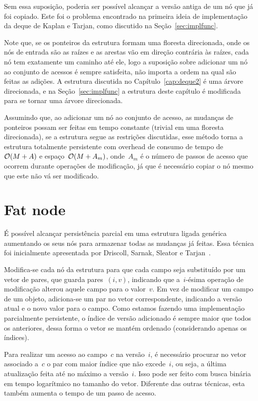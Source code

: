 \documentclass[../../main.tex]{subfiles}
\begin{document}
Sem essa suposição, poderia ser possível alcançar a versão antiga de um nó que já foi copiado. Este foi o problema encontrado na primeira ideia de implementação da deque de Kaplan e Tarjan, como discutido na Seção~\ref{sec:implfunc}.

Note que, se os ponteiros da estrutura formam uma floresta direcionada, onde os nós de entrada são as raízes e as arestas vão em direção contrária às raízes, cada nó tem exatamente um caminho até ele, logo a suposição sobre adicionar um nó ao conjunto de acessos é sempre satisfeita, não importa a ordem na qual são feitas as adições. A estrutura discutida no Capítulo~\ref{cap:deque2} é uma árvore direcionada, e na Seção~\ref{sec:implfunc} a estrutura deste capítulo é modificada para se tornar uma árvore direcionada.

Assumindo que, ao adicionar um nó ao conjunto de acesso, as mudanças de ponteiros possam ser feitas em tempo constante (trivial em uma floresta direcionada), se a estrutura segue as restrições discutidas, esse método torna a estrutura totalmente persistente com overhead de consumo de tempo de~$\mathcal{O}(M+A)$ e espaço~$\mathcal{O}(M+A_m)$, onde~$A_m$ é o número de passos de acesso que ocorrem durante operações de modificação, já que é necessário copiar o nó mesmo que este não vá ser modificado.



\section{Fat node}

É possível alcançar persistência parcial em uma estrutura ligada genérica aumentando os seus nós para armazenar todas as mudanças já feitas. Essa técnica foi inicialmente apresentada por Driscoll, Sarnak, Sleator e Tarjan~\cite{DriscollSST1989}.

Modifica-se cada nó da estrutura para que cada campo seja substituído por um vetor de pares, que guarda pares~$(i, v)$, indicando que a~$i$-ésima operação de modificação alterou aquele campo para o valor~$v$. Em vez de modificar um campo de um objeto, adiciona-se um par no vetor correspondente, indicando a versão atual e o novo valor para o campo. Como estamos fazendo uma implementação parcialmente persistente, o índice de versão adicionado é sempre maior que todos os anteriores, dessa forma o vetor se mantém ordenado (considerando apenas os índices).

Para realizar um acesso ao campo~$c$ na versão~$i$, é necessário procurar no vetor associado a~$c$ o par com maior índice que não excede~$i$, ou seja, a última atualização feita até no máximo a versão~$i$. Isso pode ser feito com busca binária em tempo logarítmico no tamanho do vetor. Diferente das outras técnicas, esta também aumenta o tempo de um passo de acesso.
\end{document}
